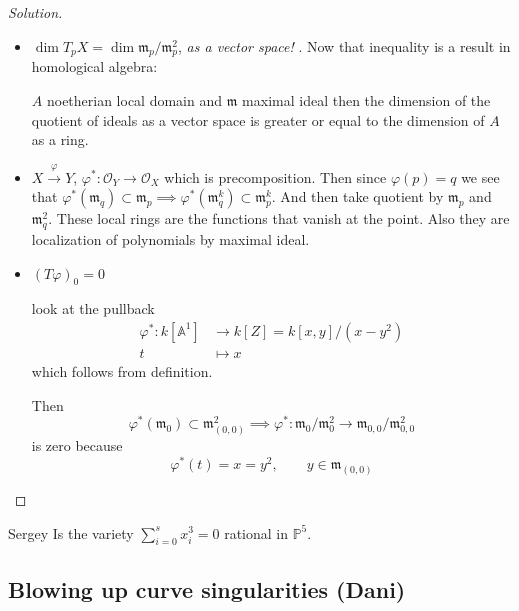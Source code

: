 \begin{proof}[Solution]\leavevmode
\begin{itemize}
\item $\dim T_pX=\dim \mathfrak{m}_p/\mathfrak{m}^2_p$, \textit{ as a vector space!} . Now that inequality is a result in homological algebra:
	\begin{thm}
		$A$ noetherian local domain and $ \mathfrak{m}$ maximal ideal then the dimension of the quotient of ideals as a vector space is greater or equal to the dimension of $A$ as a ring.
	\end{thm}
	\item 
		\begin{defn}
			$X\overset{\varphi}{\longrightarrow}Y$, $\varphi^*:\mathcal{O}_Y\to \mathcal{O}_X$ which is precomposition. Then since $\varphi(p)=q$ we see that $\varphi^*(\mathfrak{m}_q)\subset \mathfrak{m}_p\implies \varphi^* (\mathfrak{m}^k_q)\subset \mathfrak{m}^k_{p}$. And then take quotient by $\mathfrak{m}_{p}$ and $\mathfrak{m}^2_{q}$. These local rings are the functions that vanish at the point. Also they are localization of polynomials by maximal ideal.
		\end{defn}
\item
	 \begin{claim}
		 $(T\varphi)_0=0$
	\end{claim}
	look at the pullback
	\begin{align*}
		\varphi^*: k[\mathbb{A}^1] &\longrightarrow k[Z]=k[x,y]/(x-y^2) \\
		t &\longmapsto x
	\end{align*}
	which follows from definition.
	
	Then
	\[\varphi^*(\mathfrak{m}_{0})\subset \mathfrak{m}^2_{(0,0)}\implies \varphi^* :\mathfrak{m}_0/\mathfrak{m}_0^2\to \mathfrak{m}_{0,0}/\mathfrak{m}_{0,0}^2\]
	is zero because
	\[\varphi^* (t)=x=y^2,\qquad y\in\mathfrak{m}_{(0,0)}\]
	
\end{itemize}\end{proof}




\begin{manualexercise}{Sergey}
	Is the variety $\sum_{i=0}^sx_i^3=0$ rational in $\mathbb{P}^5$.
\end{manualexercise}

\subsection{Blowing up curve singularities (Dani)}




